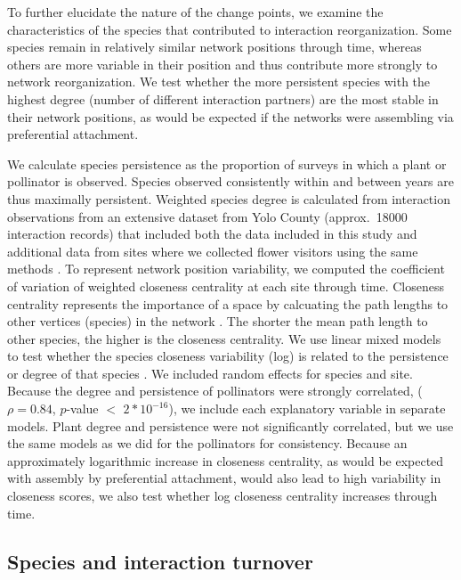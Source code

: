 \documentclass[12pt]{article}
\begin{document}
To further elucidate the nature of the change points, we examine the
characteristics of the species that contributed to interaction
reorganization. Some species remain in relatively similar network
positions through time, whereas others are more variable in their
position and thus contribute more strongly to network
reorganization. We test whether the more persistent species with the
highest degree (number of different interaction partners) are the
most stable in their network positions, as would be expected if the
networks were assembling via preferential attachment.

We calculate species persistence as the proportion of surveys in which
a plant or pollinator is observed. Species observed consistently
within and between years are thus maximally persistent. Weighted
species degree is calculated from interaction observations from an
extensive dataset from Yolo County (approx.~18000 interaction records)
that included both the data included in this study and additional data
from sites where we collected flower visitors using the same methods
\citep{mgonigle-2015-x, ponisio2015farm}. To represent network
position variability, we computed the coefficient of variation of
weighted closeness centrality \citep{freeman1978centrality} at each
site through time. Closeness centrality represents the importance of a
space by calcuating the path lengths to other vertices (species) in
the network \citep{freeman1978centrality}. The shorter the mean path
length to other species, the higher is the closeness centrality. We
use linear mixed models to test whether the species closeness
variability (log) is related to the persistence or degree of that
species \citep{lme4, lmetest}. We included random effects for species
and site. Because the degree and persistence of pollinators were
strongly correlated, ($\rho = 0.84$, $p$-value $<$ $2*10^{-16}$), we
include each explanatory variable in separate models. Plant degree and
persistence were not significantly correlated, but we use the same
models as we did for the pollinators for consistency.  Because an
approximately logarithmic increase in closeness centrality, as would
be expected with assembly by preferential attachment, would also lead
to high variability in closeness scores, we also test whether log
closeness centrality increases through time.

\subsection*{Species and interaction turnover}
\end{document}
